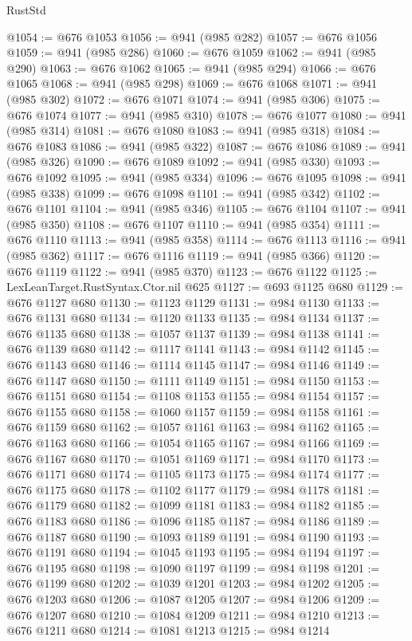 \begin{lexlean}{RustStd}
\begin{coremodule}
@1054 := @676 @1053
@1056 := @941 (@985 @282)
@1057 := @676 @1056
@1059 := @941 (@985 @286)
@1060 := @676 @1059
@1062 := @941 (@985 @290)
@1063 := @676 @1062
@1065 := @941 (@985 @294)
@1066 := @676 @1065
@1068 := @941 (@985 @298)
@1069 := @676 @1068
@1071 := @941 (@985 @302)
@1072 := @676 @1071
@1074 := @941 (@985 @306)
@1075 := @676 @1074
@1077 := @941 (@985 @310)
@1078 := @676 @1077
@1080 := @941 (@985 @314)
@1081 := @676 @1080
@1083 := @941 (@985 @318)
@1084 := @676 @1083
@1086 := @941 (@985 @322)
@1087 := @676 @1086
@1089 := @941 (@985 @326)
@1090 := @676 @1089
@1092 := @941 (@985 @330)
@1093 := @676 @1092
@1095 := @941 (@985 @334)
@1096 := @676 @1095
@1098 := @941 (@985 @338)
@1099 := @676 @1098
@1101 := @941 (@985 @342)
@1102 := @676 @1101
@1104 := @941 (@985 @346)
@1105 := @676 @1104
@1107 := @941 (@985 @350)
@1108 := @676 @1107
@1110 := @941 (@985 @354)
@1111 := @676 @1110
@1113 := @941 (@985 @358)
@1114 := @676 @1113
@1116 := @941 (@985 @362)
@1117 := @676 @1116
@1119 := @941 (@985 @366)
@1120 := @676 @1119
@1122 := @941 (@985 @370)
@1123 := @676 @1122
@1125 := LexLeanTarget.RustSyntax.Ctor.nil @625
@1127 := @693 @1125 @680
@1129 := @676 @1127 @680
@1130 := @1123 @1129
@1131 := @984 @1130
@1133 := @676 @1131 @680
@1134 := @1120 @1133
@1135 := @984 @1134
@1137 := @676 @1135 @680
@1138 := @1057 @1137
@1139 := @984 @1138
@1141 := @676 @1139 @680
@1142 := @1117 @1141
@1143 := @984 @1142
@1145 := @676 @1143 @680
@1146 := @1114 @1145
@1147 := @984 @1146
@1149 := @676 @1147 @680
@1150 := @1111 @1149
@1151 := @984 @1150
@1153 := @676 @1151 @680
@1154 := @1108 @1153
@1155 := @984 @1154
@1157 := @676 @1155 @680
@1158 := @1060 @1157
@1159 := @984 @1158
@1161 := @676 @1159 @680
@1162 := @1057 @1161
@1163 := @984 @1162
@1165 := @676 @1163 @680
@1166 := @1054 @1165
@1167 := @984 @1166
@1169 := @676 @1167 @680
@1170 := @1051 @1169
@1171 := @984 @1170
@1173 := @676 @1171 @680
@1174 := @1105 @1173
@1175 := @984 @1174
@1177 := @676 @1175 @680
@1178 := @1102 @1177
@1179 := @984 @1178
@1181 := @676 @1179 @680
@1182 := @1099 @1181
@1183 := @984 @1182
@1185 := @676 @1183 @680
@1186 := @1096 @1185
@1187 := @984 @1186
@1189 := @676 @1187 @680
@1190 := @1093 @1189
@1191 := @984 @1190
@1193 := @676 @1191 @680
@1194 := @1045 @1193
@1195 := @984 @1194
@1197 := @676 @1195 @680
@1198 := @1090 @1197
@1199 := @984 @1198
@1201 := @676 @1199 @680
@1202 := @1039 @1201
@1203 := @984 @1202
@1205 := @676 @1203 @680
@1206 := @1087 @1205
@1207 := @984 @1206
@1209 := @676 @1207 @680
@1210 := @1084 @1209
@1211 := @984 @1210
@1213 := @676 @1211 @680
@1214 := @1081 @1213
@1215 := @984 @1214

\end{coremodule}
\end{lexlean}
